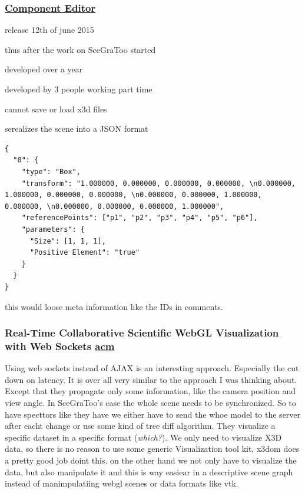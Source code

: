 \clearpage
\subsubsection{\texorpdfstring{\href{https://github.com/x3dom/component-editor}{Component
Editor}}{Component Editor}}\label{component-editor30}

\begin{itemize*}
\item release 12th of june 2015
\item thus after the work on SceGraToo started
\item developed over a year
\item developed by 3 people working part time
\item cannot save or load x3d files
\item serealizes the scene into a JSON format
\end{itemize*}

\begin{verbatim}
{
  "0": {
    "type": "Box",
    "transform": "1.000000, 0.000000, 0.000000, 0.000000, \n0.000000, 1.000000, 0.000000, 0.000000, \n0.000000, 0.000000, 1.000000, 0.000000, \n0.000000, 0.000000, 0.000000, 1.000000",
    "referencePoints": ["p1", "p2", "p3", "p4", "p5", "p6"],
    "parameters": {
      "Size": [1, 1, 1],
      "Positive Element": "true"
    }
  }
}
\end{verbatim}

\begin{itemize*}
\item
  this would loose meta information like the IDs in comments.
\end{itemize*}

\subsubsection{\texorpdfstring{Real-Time Collaborative Scientific WebGL
Visualization with Web Sockets
\href{http://doi.acm.org/10.1145/2338714.2338721}{acm}}{Real-Time Collaborative Scientific WebGL Visualization with Web Sockets acm}}\label{real-time-collaborative-scientific-webgl-visualization-with-web-sockets-acm}

Using web sockets instead of AJAX is an interesting approach. Especially
the cut down on latency. It is over all very similar to the approach I
was thinking about. Except that they propagate only some information,
like the camera position and view angle. In SceGraToo's case the whole
scene needs to be synchronized. So to have specttors like they have we
either have to send the whoe model to the server after eacht change or
use some kind of tree diff algorithm. They visualize a specific dataset
in a specific format (\emph{which?}). We only need to visualize X3D
data, so there is no reason to use some generic Visualization tool kit,
x3dom does a pretty good job doint this. on the other hand we not only
have to visualize the data, but also manipulate it and this is way
easiear in a descriptive scene graph instead of manimpulatiing webgl
scenes or data formats like vtk.


